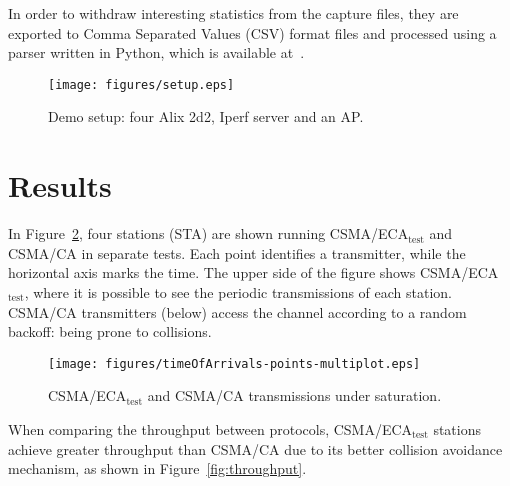 \documentclass[conference]{IEEEtran}
\begin{document}
	In order to withdraw interesting statistics from the capture files, they are exported to Comma Separated Values (CSV) format files and processed using a parser written in Python, which is available at~\cite{pcapParser}.
	
	\begin{figure}[htbp]
		\centering
		\texttt{[image: figures/setup.eps]}
		\caption{Demo setup: four Alix 2d2, Iperf server and an AP.}
		\label{fig:setup}
	\end{figure}
	
\section{Results}\label{results}
In Figure~\ref{fig:ECA-test}, four stations (STA) are shown running CSMA/ECA$_{\text{test}}$ and CSMA/CA in separate tests. Each point identifies a transmitter, while the horizontal axis marks the time. The upper side of the figure shows CSMA/ECA$_{\text{test}}$, where it is possible to see the periodic transmissions of each station. CSMA/CA transmitters (below) access the channel according to a random backoff: being prone to collisions. 


	\begin{figure}[htbp]
		\centering
		\texttt{[image: figures/timeOfArrivals-points-multiplot.eps]}
		\caption{CSMA/ECA$_{\text{test}}$ and CSMA/CA transmissions under saturation.}
		\label{fig:ECA-test}
	\end{figure}

When comparing the throughput between protocols, CSMA/ECA$_{\text{test}}$ stations achieve greater throughput than CSMA/CA due to its better collision avoidance mechanism, as shown in Figure~\ref{fig:throughput}.
\end{document}
